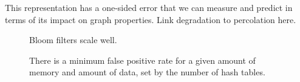 \documentclass[12pt]{article} \usepackage{simplemargins}
\begin{document}
This representation has a one-sided error that we can measure and
predict in terms of its impact on graph properties.  Link degradation
to percolation here.

\begin{figure}
\caption{Bloom filters scale well.}
\end{figure}

\begin{figure}
\caption{There is a minimum false positive rate for a given amount of memory
and amount of data, set by the number of hash tables.}
\end{figure}
\end{document}
